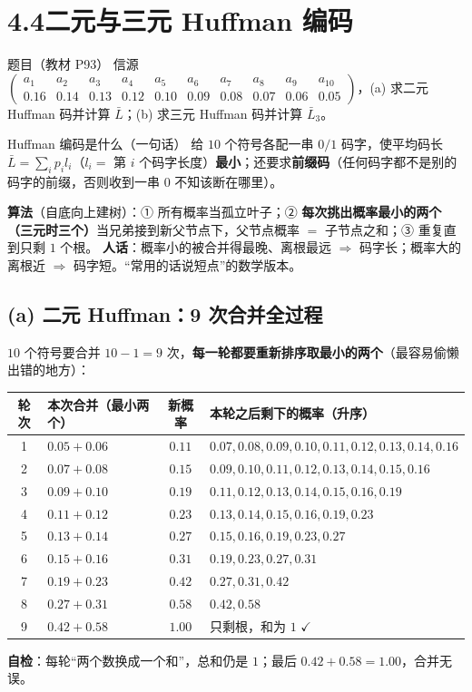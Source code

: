 \documentclass[11pt,a4paper]{ctexart}
\begin{document}
\section{4.4\quad 二元与三元 Huffman 编码}

\begin{defbox}{题目（教材 P93）}
信源 $\begin{pmatrix} a_1&a_2&a_3&a_4&a_5&a_6&a_7&a_8&a_9&a_{10}\\ 0.16&0.14&0.13&0.12&0.10&0.09&0.08&0.07&0.06&0.05\end{pmatrix}$，(a) 求二元 Huffman 码并计算 $\bar L$；(b) 求三元 Huffman 码并计算 $\bar L_3$。
\end{defbox}

\begin{idea}{Huffman 编码是什么（一句话）}
给 $10$ 个符号各配一串 $0/1$ 码字，使平均码长 $\bar L=\sum_i p_il_i$（$l_i=$ 第 $i$ 个码字长度）\textbf{最小}；还要求\textbf{前缀码}（任何码字都不是别的码字的前缀，否则收到一串 $0$ 不知该断在哪里）。

\textbf{算法}（自底向上建树）：① 所有概率当孤立叶子；② \textbf{每次挑出概率最小的两个（三元时三个）}当兄弟接到新父节点下，父节点概率 $=$ 子节点之和；③ 重复直到只剩 $1$ 个根。
\textbf{人话}：概率小的被合并得最晚、离根最远 $\Rightarrow$ 码字长；概率大的离根近 $\Rightarrow$ 码字短。“常用的话说短点”的数学版本。
\end{idea}

\subsection{(a) 二元 Huffman：9 次合并全过程}
$10$ 个符号要合并 $10-1=9$ 次，\textbf{每一轮都要重新排序取最小的两个}（最容易偷懒出错的地方）：

\begin{center}
\small
\begin{tabular}{@{}c l c l@{}}
\toprule
轮次 & 本次合并（最小两个） & 新概率 & 本轮之后剩下的概率（升序）\\
\midrule
1 & $0.05+0.06$ & $0.11$ & $0.07,0.08,0.09,0.10,\mathbf{0.11},0.12,0.13,0.14,0.16$\\
2 & $0.07+0.08$ & $0.15$ & $0.09,0.10,0.11,0.12,0.13,0.14,\mathbf{0.15},0.16$\\
3 & $0.09+0.10$ & $0.19$ & $0.11,0.12,0.13,0.14,0.15,0.16,\mathbf{0.19}$\\
4 & $0.11+0.12$ & $0.23$ & $0.13,0.14,0.15,0.16,0.19,\mathbf{0.23}$\\
5 & $0.13+0.14$ & $0.27$ & $0.15,0.16,0.19,0.23,\mathbf{0.27}$\\
6 & $0.15+0.16$ & $0.31$ & $0.19,0.23,0.27,\mathbf{0.31}$\\
7 & $0.19+0.23$ & $0.42$ & $0.27,0.31,\mathbf{0.42}$\\
8 & $0.27+0.31$ & $0.58$ & $0.42,\mathbf{0.58}$\\
9 & $0.42+0.58$ & $1.00$ & 只剩根，和为 $1$ $\checkmark$\\
\bottomrule
\end{tabular}
\end{center}
\textbf{自检}：每轮“两个数换成一个和”，总和仍是 $1$；最后 $0.42+0.58=1.00$，合并无误。
\end{document}
